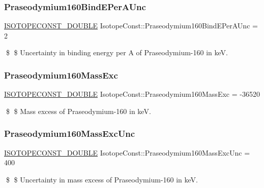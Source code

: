 \subsubsection{\texorpdfstring{Praseodymium160\+Bind\+E\+Per\+A\+Unc}{Praseodymium160BindEPerAUnc}}
{\footnotesize\ttfamily \mbox{\hyperlink{group___isotope_const-_macros_ga8f45a7272ce02c0b4c65c44636ed719a}{I\+S\+O\+T\+O\+P\+E\+C\+O\+N\+S\+T\+\_\+\+D\+O\+U\+B\+LE}} Isotope\+Const\+::\+Praseodymium160\+Bind\+E\+Per\+A\+Unc = 2}

\$ \$ Uncertainty in binding energy per A of Praseodymium-\/160 in keV. \mbox{\label{group___isotope_const-_praseodymium-_pr160_ga4b6c007b88ef044c9bd21476b5eb8b96}} 
\subsubsection{\texorpdfstring{Praseodymium160\+Mass\+Exc}{Praseodymium160MassExc}}
{\footnotesize\ttfamily \mbox{\hyperlink{group___isotope_const-_macros_ga8f45a7272ce02c0b4c65c44636ed719a}{I\+S\+O\+T\+O\+P\+E\+C\+O\+N\+S\+T\+\_\+\+D\+O\+U\+B\+LE}} Isotope\+Const\+::\+Praseodymium160\+Mass\+Exc = -\/36520}

\$ \$ Mass excess of Praseodymium-\/160 in keV. \mbox{\label{group___isotope_const-_praseodymium-_pr160_ga5c252d03ab2c3024e6e657be7bc512f6}} 
\subsubsection{\texorpdfstring{Praseodymium160\+Mass\+Exc\+Unc}{Praseodymium160MassExcUnc}}
{\footnotesize\ttfamily \mbox{\hyperlink{group___isotope_const-_macros_ga8f45a7272ce02c0b4c65c44636ed719a}{I\+S\+O\+T\+O\+P\+E\+C\+O\+N\+S\+T\+\_\+\+D\+O\+U\+B\+LE}} Isotope\+Const\+::\+Praseodymium160\+Mass\+Exc\+Unc = 400}

\$ \$ Uncertainty in mass excess of Praseodymium-\/160 in keV. \mbox{\label{group___isotope_const-_praseodymium-_pr160_ga8a5e866884af8b716f9708f93fa9755d}} 
